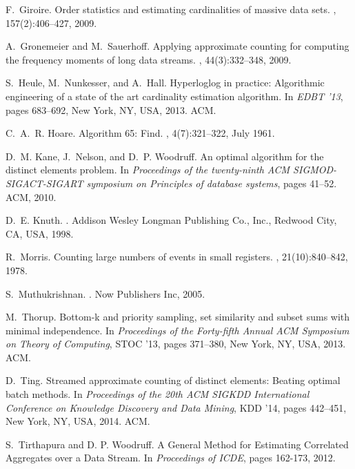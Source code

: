 \documentclass{article}
\begin{document}
\begin{thebibliography}{10}
F.~Giroire.
\newblock Order statistics and estimating cardinalities of massive data sets.
, 157(2):406--427, 2009.

A.~Gronemeier and M.~Sauerhoff.
\newblock Applying approximate counting for computing the frequency moments of
  long data streams.
, 44(3):332--348, 2009.

S.~Heule, M.~Nunkesser, and A.~Hall.
\newblock Hyperloglog in practice: Algorithmic engineering of a state of the
  art cardinality estimation algorithm.
\newblock In {\em EDBT '13}, pages 683--692, New York, NY, USA, 2013. ACM.

C.~A.~R. Hoare.
\newblock Algorithm 65: Find.
, 4(7):321--322, July 1961.

D.~M. Kane, J.~Nelson, and D.~P. Woodruff.
\newblock An optimal algorithm for the distinct elements problem.
\newblock In {\em Proceedings of the twenty-ninth ACM SIGMOD-SIGACT-SIGART
  symposium on Principles of database systems}, pages 41--52. ACM, 2010.

D.~E. Knuth.
.
\newblock Addison Wesley Longman Publishing Co., Inc., Redwood City, CA, USA,
  1998.

R.~Morris.
\newblock Counting large numbers of events in small registers.
, 21(10):840--842, 1978.

S.~Muthukrishnan.
.
\newblock Now Publishers Inc, 2005.

M.~Thorup.
\newblock Bottom-k and priority sampling, set similarity and subset sums with
  minimal independence.
\newblock In {\em Proceedings of the Forty-fifth Annual ACM Symposium on Theory
  of Computing}, STOC '13, pages 371--380, New York, NY, USA, 2013. ACM.

D.~Ting.
\newblock Streamed approximate counting of distinct elements: Beating optimal
  batch methods.
\newblock In {\em Proceedings of the 20th ACM SIGKDD International Conference
  on Knowledge Discovery and Data Mining}, KDD '14, pages 442--451, New York,
  NY, USA, 2014. ACM.
  
 S.~Tirthapura and D. P. Woodruff.
\newblock A General Method for Estimating Correlated Aggregates over a Data Stream. 
In \emph{Proceedings of ICDE}, pages 162-173, 2012.

\end{thebibliography}
 \appendix
\end{document}
